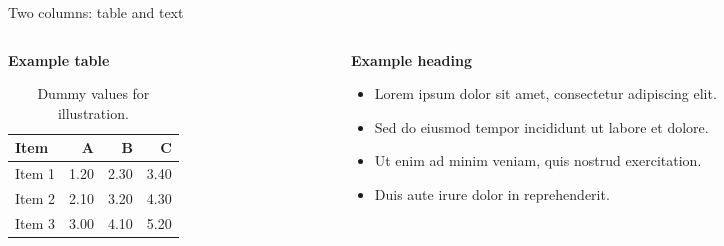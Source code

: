\begin{frame}[t]{Two columns: table and text}
    \begin{columns}[T,onlytextwidth]
        \begin{column}{0.62\textwidth}
            \textbf{Example table}
            \begin{table}
                \centering
                \begin{tabular}{lrrr}
                    \toprule
                    \textbf{Item} & \textbf{A} & \textbf{B} & \textbf{C} \\
                    \midrule
                    Item 1 & 1.20 & 2.30 & 3.40 \\
                    \rowcolor{light-gray}
                    Item 2 & 2.10 & 3.20 & 4.30 \\
                    Item 3 & 3.00 & 4.10 & 5.20 \\
                    \bottomrule
                \end{tabular}
                \caption{Dummy values for illustration.}
            \end{table}
        \end{column}
        \begin{column}{0.34\textwidth}
            \textbf{Example heading}
            \begin{itemize}
                \item Lorem ipsum dolor sit amet, consectetur adipiscing elit.
                \item Sed do eiusmod tempor incididunt ut labore et dolore.
                \item Ut enim ad minim veniam, quis nostrud exercitation.
                \item Duis aute irure dolor in reprehenderit.
            \end{itemize}
        \end{column}
    \end{columns}
\end{frame}

